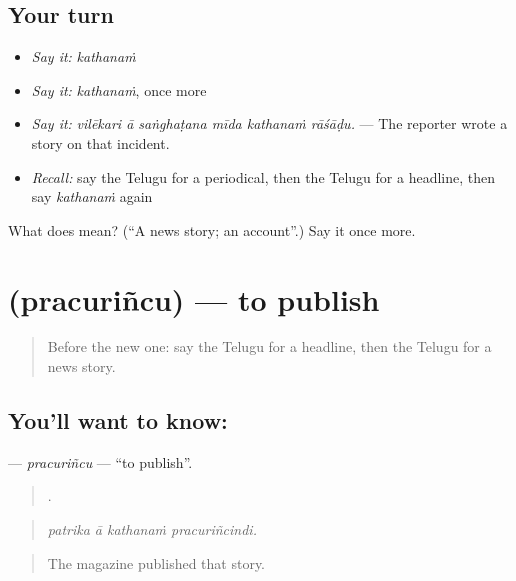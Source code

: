 \subsection*{Your turn}
\begin{itemize}
\raggedright
  \item \emph{Say it:} \emph{kathanaṁ}
  \item \emph{Say it:} \emph{kathanaṁ}, once more
  \item \emph{Say it:} \emph{vilēkari ā saṅghaṭana mīda kathanaṁ rāśāḍu.} — The reporter wrote a story on that incident.
  \item \emph{Recall:} say the Telugu for a periodical, then the Telugu for a headline, then say \emph{kathanaṁ} again
\end{itemize}

\begin{tcolorbox}[breakable,colback=teal!4,colframe=teal!35!black,title={Before you move on}]
What does  mean? (\textquotedblleft{}A news story; an account\textquotedblright{}.) Say it once more.
\end{tcolorbox}
\section[\texorpdfstring{\te{ప్రచురించు} (pracuriñcu)}{ప్రచురించు (pracuriñcu)}]{ (pracuriñcu) — to publish}

\label{lesson:TE-C330-pracurincu}



\begin{quote}
Before the new one: say the Telugu for a headline, then the Telugu for a news story.
\end{quote}

\subsection*{You'll want to know: }
\textbf{} — \emph{pracuriñcu} — \textquotedblleft{}to publish\textquotedblright{}.

\begin{quote}
   .
\end{quote}

\begin{quote}
\emph{patrika ā kathanaṁ pracuriñcindi.}
\end{quote}

\begin{quote}
The magazine published that story.
\end{quote}

